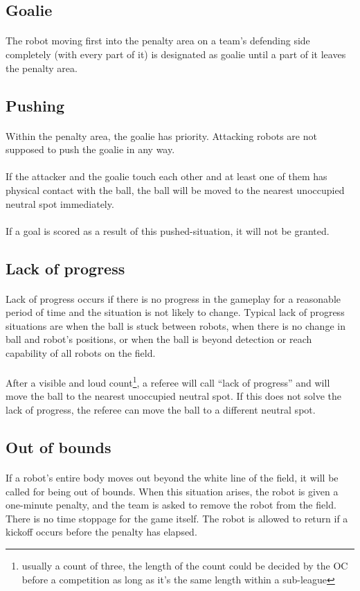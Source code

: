 \documentclass{article}
\newcommand*{\p}{\paragraph{}}
\begin{document}
\subsection{Goalie \label{ref-008}}

\p The robot moving first into the penalty area on a team's defending side
completely (with every part of it) is designated as goalie until a part of it
leaves the penalty area.

\subsection{Pushing \label{ref-pushing}}

\p Within the penalty area, the goalie has priority. Attacking robots are not
supposed to push the goalie in any way.

\p If the attacker and the goalie touch each other and at least one of them has
physical contact with the ball, the ball will be moved to the nearest
unoccupied neutral spot immediately.

\p If a goal is scored as a result of this pushed-situation, it will not be
granted.

\subsection{Lack of progress \label{ref-lack-of-progress}}

\p Lack of progress occurs if there is no progress in the gameplay for a
reasonable period of time and the situation is not likely to change. Typical
lack of progress situations are when the ball is stuck between robots, when
there is no change in ball and robot's positions, or when the ball is beyond
detection or reach capability of all robots on the field.

\p After a visible and loud count\footnote{usually a count of three, the length
of the count could be decided by the OC before a competition as long as it's
the same length within a sub-league}, a referee will call ``lack of progress''
and will move the ball to the nearest unoccupied neutral spot. If this does not
solve the lack of progress, the referee can move the ball to a different
neutral spot.

\subsection{Out of bounds \label{ref-011}}

\p If a robot's entire body moves out beyond the white line of the field, it
will be called for being out of bounds. When this situation arises, the robot
is given a one-minute penalty, and the team is asked to remove the robot from
the field. There is no time stoppage for the game itself. The robot is allowed
to return if a kickoff occurs before the penalty has elapsed.
\end{document}
